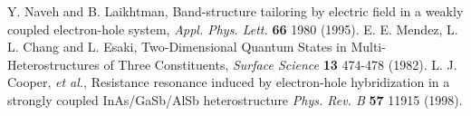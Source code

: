 \documentclass[titlepage,a4paper]{book}
\begin{document}
\begin{thebibliography}{99}
Y. Naveh and B. Laikhtman, Band-structure tailoring by electric field in a weakly coupled electron-hole system, \textit{Appl. Phys. Lett.} \textbf{66} 1980 (1995).
E. E. Mendez, L. L. Chang and L. Esaki, Two-Dimensional Quantum States in Multi-Heterostructures of Three Constituents, \textit{Surface Science} \textbf{13} 474-478 (1982).
L. J. Cooper, \textit{et al.}, Resistance resonance induced by electron-hole hybridization in a strongly coupled InAs/GaSb/AlSb heterostructure \textit{Phys. Rev. B} \textbf{57} 11915 (1998).

\end{thebibliography}
\end{document}
